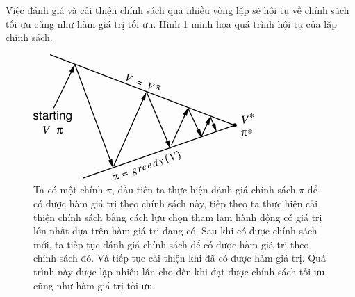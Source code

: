 Việc đánh giá và cải thiện chính sách qua nhiều vòng lặp sẽ hội tụ về chính sách tối ưu cũng như hàm giá trị tối ưu. Hình \ref{fig:policy_iteration_MDP} minh họa quá trình hội tụ của lặp chính sách.
\begin{figure}
	\centering
	\includegraphics[width=\textwidth]{policy_iteration}
	\caption[Hội tụ của quy trình tìm kiếm chính sách tối ưu]{Ta có một chính $\pi$, đầu tiên ta thực hiện đánh giá chính sách $\pi$ để có được hàm giá trị theo chính sách này, tiếp theo ta thực hiện cải thiện chính sách bằng cách lựu chọn tham lam hành động có giá trị lớn nhất dựa trên hàm giá trị đang có. Sau khi có được chính sách mới, ta tiếp tục đánh giá chính sách để có được hàm giá trị theo chính sách đó. Và tiếp tục cải thiện khi đã có được hàm giá trị. Quá trình này được lặp nhiều lần cho đến khi đạt được chính sách tối ưu cũng như hàm giá trị tối ưu.}
	\label{fig:policy_iteration_MDP}
	
\end{figure}

